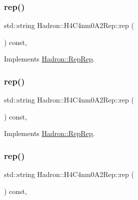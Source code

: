 \subsubsection{\texorpdfstring{rep()}{rep()}\hspace{0.1cm}{\footnotesize\ttfamily [1/3]}}
{\footnotesize\ttfamily std\+::string Hadron\+::\+H4\+C4nm0\+A2\+Rep\+::rep (\begin{DoxyParamCaption}{ }\end{DoxyParamCaption}) const\hspace{0.3cm}{\ttfamily [inline]}, {\ttfamily [virtual]}}



Implements \mbox{\hyperlink{structHadron_1_1RepRep_ab3213025f6de249f7095892109575fde}{Hadron\+::\+Rep\+Rep}}.

\mbox{\label{structHadron_1_1H4C4nm0A2Rep_a8da7c1c6f969806290e6452367fce7ea}} 
\subsubsection{\texorpdfstring{rep()}{rep()}\hspace{0.1cm}{\footnotesize\ttfamily [2/3]}}
{\footnotesize\ttfamily std\+::string Hadron\+::\+H4\+C4nm0\+A2\+Rep\+::rep (\begin{DoxyParamCaption}{ }\end{DoxyParamCaption}) const\hspace{0.3cm}{\ttfamily [inline]}, {\ttfamily [virtual]}}



Implements \mbox{\hyperlink{structHadron_1_1RepRep_ab3213025f6de249f7095892109575fde}{Hadron\+::\+Rep\+Rep}}.

\mbox{\label{structHadron_1_1H4C4nm0A2Rep_a8da7c1c6f969806290e6452367fce7ea}} 
\subsubsection{\texorpdfstring{rep()}{rep()}\hspace{0.1cm}{\footnotesize\ttfamily [3/3]}}
{\footnotesize\ttfamily std\+::string Hadron\+::\+H4\+C4nm0\+A2\+Rep\+::rep (\begin{DoxyParamCaption}{ }\end{DoxyParamCaption}) const\hspace{0.3cm}{\ttfamily [inline]}, {\ttfamily [virtual]}}



